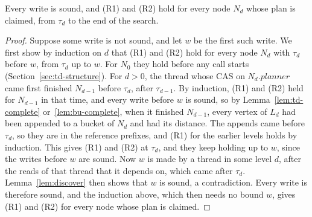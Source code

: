 \begin{lemma}
\label{lem:ready}
Every write is sound, and (R1) and (R2) hold for every node $N_d$ whose plan is claimed, from $\tau_d$ to the end of the search.
\end{lemma}
\begin{proof}
Suppose some write is not sound, and let $w$ be the first such write. We first show by induction on $d$ that (R1) and (R2) hold for every node $N_d$ with $\tau_d$ before $w$, from $\tau_d$ up to $w$. For $N_0$ they hold before any call starts (Section~\ref{sec:td-structure}). For $d > 0$, the thread whose CAS on $N_d.\mathit{planner}$ came first finished $N_{d-1}$ before $\tau_d$, after $\tau_{d-1}$. By induction, (R1) and (R2) held for $N_{d-1}$ in that time, and every write before $w$ is sound, so by Lemma~\ref{lem:td-complete} or~\ref{lem:bu-complete}, when it finished $N_{d-1}$, every vertex of $L_d$ had been appended to a bucket of $N_d$ and had its distance. The appends came before $\tau_d$, so they are in the reference prefixes, and (R1) for the earlier levels holds by induction. This gives (R1) and (R2) at $\tau_d$, and they keep holding up to $w$, since the writes before $w$ are sound. Now $w$ is made by a thread in some level $d$, after the reads of that thread that it depends on, which came after $\tau_d$. Lemma~\ref{lem:discover} then shows that $w$ is sound, a contradiction. Every write is therefore sound, and the induction above, which then needs no bound $w$, gives (R1) and (R2) for every node whose plan is claimed.
\end{proof}


